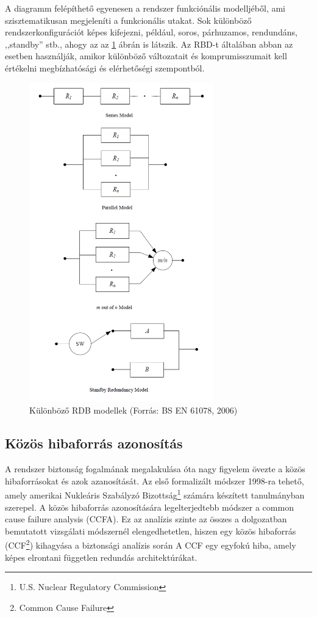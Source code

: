 A diagramm felépíthető egyenesen a rendszer funkciónális modelljéből, ami szisztematikusan megjeleníti a funkcionális utakat.
Sok különböző rendszerkonfigurációt képes kifejezni, például, soros, párhuzamos, rendundáns, ,,standby'' stb., ahogy az az \ref{fig:rdb} ábrán is látszik.
Az RBD-t általában abban az esetben használják, amikor különböző változatait és komprumisszumait kell értékelni megbízhatósági és elérhetőségi szempontból.
\begin{figure}
    \footnotesize
    \centering
    \includegraphics[width=80mm, keepaspectratio]{figures/rbd1.png}
    \caption{Különböző RDB modellek (Forrás: BS EN 61078, 2006)}
    \label{fig:rdb}
\end{figure}

\subsection{Közös hibaforrás azonosítás}
A rendszer biztonság fogalmának megalakulása óta nagy figyelem övezte a közös hibaforrásokat és azok azanosítását.
Az első formalizált módszer 1998-ra tehető, amely amerikai Nukleáris Szabályzó Bizottság\footnote{U.S. Nuclear Regulatory Commission} számára készített tanulmányban szerepel.
A közös hibaforrás azonosítására legelterjedtebb módszer a common cause failure analysis (CCFA).
Ez az analízis szinte az összes a dolgozatban bemutatott vizsgálati módszernél elengedhetetlen, hiszen egy közös hibaforrás (CCF\footnote{Common Cause Failure}) kihagyása a biztonsági analízis során 
A CCF egy egyfokú hiba, amely képes elrontani független redundás architektúrákat. \cite{Ericson}

